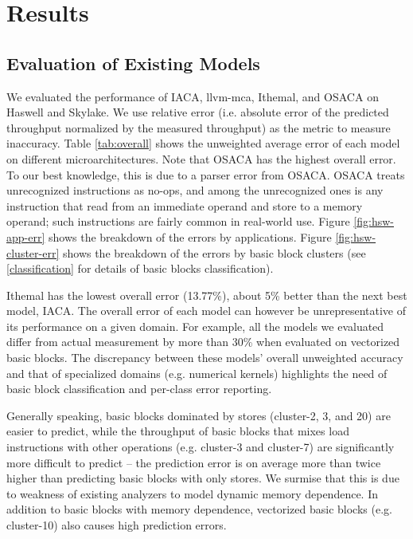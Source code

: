 \section{Results}

\subsection{Evaluation of Existing Models}
We evaluated the performance of IACA, llvm-mca, Ithemal\cite{ithemal}, and OSACA\cite{osaca}
on Haswell and Skylake.
We use relative error (i.e. absolute error of the predicted throughput normalized by the measured throughput)
as the metric to measure inaccuracy.
Table \ref{tab:overall} shows the unweighted average error
of each model on different microarchitectures.
Note that OSACA\cite{osaca} has the highest overall error.
To our best knowledge, this is due to a parser error from OSACA.
OSACA treats unrecognized instructions as no-ops,
and among the unrecognized ones is any instruction that
read from an immediate operand and store to a memory operand;
such instructions are fairly common in real-world use.
Figure \ref{fig:hsw-app-err} shows the breakdown of the errors by applications.
Figure \ref{fig:hsw-cluster-err} shows the breakdown of the errors by basic block clusters
(see \ref{classification} for details of basic blocks classification).

Ithemal\cite{ithemal} has the lowest overall error (13.77\%),
about 5\% better than the next best model, IACA.
The overall error of each model can however be unrepresentative
of its performance on a given domain.
For example, all the models we evaluated differ from
actual measurement by more than 30\% when evaluated on vectorized basic blocks.
The discrepancy between these models' overall unweighted accuracy
and that of specialized domains (e.g. numerical kernels) highlights
the need of basic block classification and per-class error reporting.

Generally speaking, basic blocks dominated by stores
(cluster-2, 3, and 20) are easier to predict,
while the throughput of basic blocks that mixes load instructions
with other operations (e.g. cluster-3 and cluster-7) are significantly 
more difficult to predict -- the prediction error is on average more than
twice higher than predicting basic blocks with only stores. 
We surmise that this is due to weakness of existing analyzers to model 
dynamic memory dependence.
In addition to basic blocks with memory dependence,
vectorized basic blocks (e.g. cluster-10) also causes high prediction errors.

